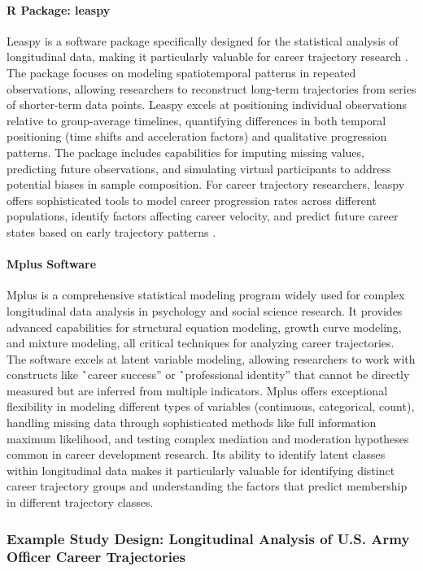 \documentclass[../main.tex]{subfiles}
\begin{document}
\paragraph{R Package: leaspy}
Leaspy is a software package specifically designed for the statistical analysis of longitudinal data, making it particularly valuable for career trajectory research \cite{leaspy2024}. The package focuses on modeling spatiotemporal patterns in repeated observations, allowing researchers to reconstruct long-term trajectories from series of shorter-term data points. Leaspy excels at positioning individual observations relative to group-average timelines, quantifying differences in both temporal positioning (time shifts and acceleration factors) and qualitative progression patterns. The package includes capabilities for imputing missing values, predicting future observations, and simulating virtual participants to address potential biases in sample composition. For career trajectory researchers, leaspy offers sophisticated tools to model career progression rates across different populations, identify factors affecting career velocity, and predict future career states based on early trajectory patterns \cite{leaspy2024}.

\paragraph{Mplus Software}
Mplus is a comprehensive statistical modeling program widely used for complex longitudinal data analysis in psychology and social science research. It provides advanced capabilities for structural equation modeling, growth curve modeling, and mixture modeling, all critical techniques for analyzing career trajectories. The software excels at latent variable modeling, allowing researchers to work with constructs like \``career success'' or \``professional identity'' that cannot be directly measured but are inferred from multiple indicators. Mplus offers exceptional flexibility in modeling different types of variables (continuous, categorical, count), handling missing data through sophisticated methods like full information maximum likelihood, and testing complex mediation and moderation hypotheses common in career development research. Its ability to identify latent classes within longitudinal data makes it particularly valuable for identifying distinct career trajectory groups and understanding the factors that predict membership in different trajectory classes.

\subsubsection{Example Study Design: Longitudinal Analysis of U.S. Army Officer Career Trajectories}
\end{document}
